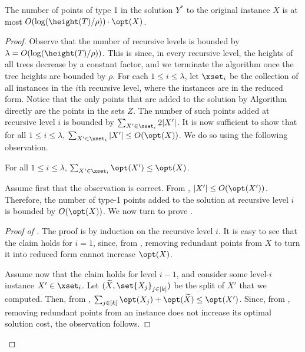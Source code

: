 \begin{claim}\label{claim: type 1 points}
	The number of points of type 1 in the solution $Y^*$ to the original instance $X$ is at most $O(\log(\height(T)/\rho))\cdot \opt(X)$.
	\end{claim}

\begin{proof}
	Observe that the number of recursive levels is bounded by $\lambda =O(\log(\height(T)/\rho))$. 
	This is since, in every recursive level, the heights of all trees decrease by a constant factor, and we terminate the algorithm once the tree heights are bounded by $\rho$.
	 For each $1\leq i\leq \lambda$, let $\xset_i$ be the collection of all instances in the $i$th recursive level, where the instances are in the reduced form. Notice that the only points that are added to the solution by Algorithm \recBST directly are the points in the sets $Z$. The number of such points added at recursive level $i$ is bounded by $\sum_{X'\in \xset_i}2|X'|$. It is now sufficient to show that for all $1\leq i\leq \lambda$, $\sum_{X'\in \xset_i}|X'|\leq O(\opt(X))$. We do so using the following observation.
	
	\begin{myobs}\label{obs: type 1 points}
		For all $1\leq i\leq \lambda$, $\sum_{X'\in \xset_i}\opt(X')\leq \opt(X)$.
		\end{myobs}
	
	Assume first that the observation is correct. From , $|X'|\leq O(\opt(X'))$. Therefore, the number of type-1 points added to  the solution at recursive level $i$ is bounded by $O(\opt(X))$.
We now turn to prove .
\begin{proof}[Proof of ]
	The proof is by induction on the recursive level $i$. It is easy to see that the claim holds for $i=1$, since, from , removing redundant points from $X$ to turn it into reduced form cannot increase $\opt(X)$.
	
	Assume now that the claim holds for level $i-1$, and consider some level-$i$ instance $X'\in \xset_i$. Let $(\widetilde{X},\set{X_j}_{j \in [k]})$ be the split of  $X'$ that we computed. Then, from  , $\sum_{j \in [k]}\opt(X_j) + \opt(\widetilde{X}) \leq \opt(X')$. Since, from , removing redundant points from an instance does not increase its optimal solution cost, the observation follows.
\end{proof}		 
\end{proof}

